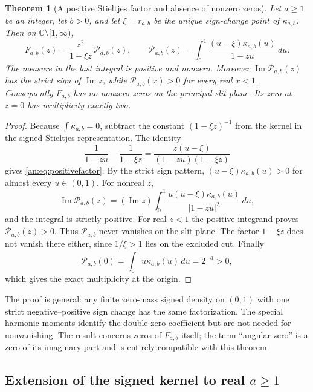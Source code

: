 \documentclass[11pt]{article}
\numberwithin{equation}{section}
\theoremstyle{plain}
\newtheorem{theorem}{Theorem}[section]
\theoremstyle{definition}
\theoremstyle{remark}
\begin{document}
\begin{theorem}[A positive Stieltjes factor and absence of nonzero zeros]
\label{an:thm:zerofree}
Let $a\ge1$ be an integer, let $b>0$, and let $\xi=r_{a,b}$ be the
unique sign-change point of $\kappa_{a,b}$. Then on
$\mathbb C\setminus[1,\infty)$,
\begin{equation}\label{an:eq:positivefactor}
 F_{a,b}(z)=\frac{z^2}{1-\xi z}\,\mathcal P_{a,b}(z),\qquad
 \mathcal P_{a,b}(z)=\int_0^1\frac{(u-\xi)\kappa_{a,b}(u)}{1-zu}\,du.
\end{equation}
The measure in the last integral is positive and nonzero.
Moreover $\operatorname{Im}\mathcal P_{a,b}(z)$ has the strict sign of
$\operatorname{Im}z$, while $\mathcal P_{a,b}(x)>0$ for every real $x<1$.
Consequently $F_{a,b}$ has no nonzero zeros on the principal slit
plane. Its zero at $z=0$ has multiplicity exactly two.
\end{theorem}
\begin{proof}
Because $\int\kappa_{a,b}=0$, subtract the constant
$(1-\xi z)^{-1}$ from the kernel in the signed Stieltjes
representation. The identity
\[
 \frac1{1-zu}-\frac1{1-\xi z}
 =\frac{z(u-\xi)}{(1-zu)(1-\xi z)}
\]
gives \eqref{an:eq:positivefactor}. By the strict sign pattern,
$(u-\xi)\kappa_{a,b}(u)>0$ for almost every $u\in(0,1)$.
For nonreal $z$,
\[
 \operatorname{Im}\mathcal P_{a,b}(z)
 =(\operatorname{Im}z)\int_0^1
    \frac{u(u-\xi)\kappa_{a,b}(u)}{|1-zu|^2}\,du,
\]
and the integral is strictly positive. For real $z<1$ the positive
integrand proves $\mathcal P_{a,b}(z)>0$. Thus $\mathcal P_{a,b}$ never vanishes on
the slit plane. The factor $1-\xi z$ does not vanish there either,
since $1/\xi>1$ lies on the excluded cut. Finally
\[
 \mathcal P_{a,b}(0)=\int_0^1u\kappa_{a,b}(u)\,du=2^{-a}>0,
\]
which gives the exact multiplicity at the origin.
\end{proof}

The proof is general: any finite zero-mass signed density on $(0,1)$
with one strict negative--positive sign change has the same factorization.
The special harmonic moments identify the double-zero coefficient but
are not needed for nonvanishing. The result concerns zeros of
$F_{a,b}$ itself; the term ``angular zero'' is a zero of its
imaginary part and is entirely compatible with this theorem.

\subsection{Extension of the signed kernel to real \texorpdfstring{$a\ge1$}{a >= 1}}
\end{document}

